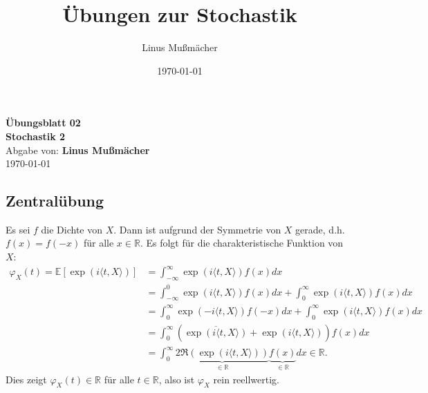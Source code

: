 \documentclass[a4paper]{article}
\title{Übungen zur Stochastik}
\author{Linus Mußmächer}
\date{\today}
\def\sheetNumber{02}
\def\names{Linus Mußmächer}
\def\sumPoints{30}
\let\oldphi\phi
\let\phi\varphi
\let\varphi\oldphi
\begin{document}
\begin{doublespace}
	\begin{center}
		\textbf{\Large{Übungsblatt \sheetNumber}}\\
		\textbf{\Large{Stochastik 2}}\\
		Abgabe von: \textbf{\names}\\
		\today
	\end{center}
\end{doublespace}




\subsection{Zentralübung}

Es sei $f$ die Dichte von $X$. Dann ist aufgrund der Symmetrie von $X$ gerade, d.h. $f(x) = f(-x)$ für alle $x \in \mathds{R}$. Es folgt für die charakteristische Funktion von $X$:
\begin{align*}
	\phi_X(t) = \mathds{E}[\exp(i \langle t, X \rangle)] & = \int_{-\infty}^{\infty} \exp(i\langle t, X \rangle) f(x) dx                                                                                     \\
	                                                     & = \int_{-\infty}^{0} \exp(i\langle t, X \rangle) f(x) dx + \int_{0}^{\infty} \exp(i\langle t, X \rangle) f(x) dx                                  \\
	                                                     & = \int_{0}^{\infty} \exp(-i\langle t, X \rangle) f(-x) dx + \int_{0}^{\infty} \exp(i\langle t, X \rangle) f(x) dx                                 \\
	                                                     & = \int_{0}^{\infty} (\overline{\exp(i\langle t, X \rangle)} + \exp(i\langle t, X \rangle)) f(x) dx
	\\
	                                                     & = \int_{0}^{\infty} \underbrace{2 \Re(\exp(i\langle t, X \rangle))}_{\in \mathds{R}} \underbrace{f(x)}_{\in \mathds{R}} dx \in \mathds{R}\text{.}
\end{align*}
Dies zeigt $\phi_X(t) \in \mathds{R}$ für alle $t \in \mathds{R}$, also ist $\phi_X$ rein reellwertig.
\end{document}
